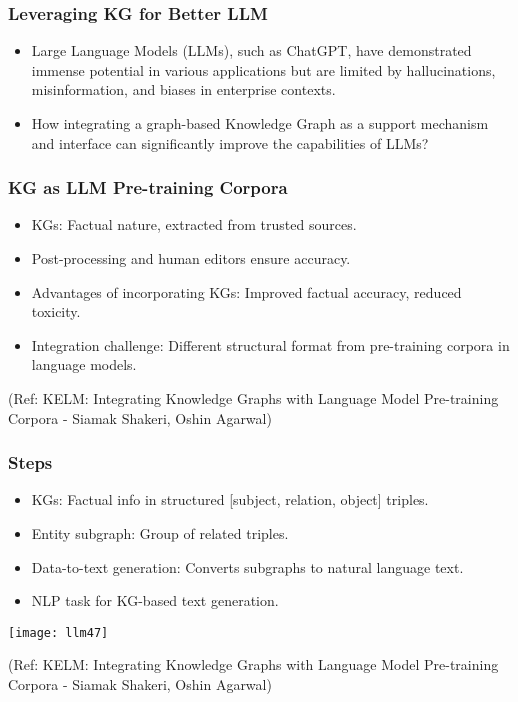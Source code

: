 \begin{frame}[fragile]\frametitle{Leveraging KG for Better LLM}

\begin{itemize}
\item Large Language Models (LLMs), such as ChatGPT, have demonstrated immense potential in various applications but are limited by hallucinations, misinformation, and biases in enterprise contexts.
\item How integrating a graph-based Knowledge Graph as a support mechanism and interface can significantly improve the capabilities of LLMs?
\end{itemize}	

\end{frame}




\begin{frame}[fragile]\frametitle{KG as LLM Pre-training Corpora}

\begin{itemize}
\item KGs: Factual nature, extracted from trusted sources.
\item Post-processing and human editors ensure accuracy.
\item Advantages of incorporating KGs: Improved factual accuracy, reduced toxicity.
\item Integration challenge: Different structural format from pre-training corpora in language models.
\end{itemize}	

{\tiny (Ref: KELM: Integrating Knowledge Graphs with Language Model Pre-training Corpora - Siamak Shakeri, Oshin Agarwal)}
\end{frame}


\begin{frame}[fragile]\frametitle{Steps}

\begin{itemize}
\item  KGs: Factual info in structured [subject, relation, object] triples.
\item  Entity subgraph: Group of related triples.
\item  Data-to-text generation: Converts subgraphs to natural language text.
\item  NLP task for KG-based text generation.
\end{itemize}

\begin{center}
\texttt{[image: llm47]}
\end{center}	

{\tiny (Ref: KELM: Integrating Knowledge Graphs with Language Model Pre-training Corpora - Siamak Shakeri, Oshin Agarwal)}
\end{frame}

